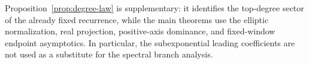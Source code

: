 \begin{remark}\label{rem:linear-degree-growth}
Proposition~\ref{prop:degree-law} is supplementary: it identifies the top-degree sector of the already fixed recurrence, while the main theorems use the elliptic normalization, real projection, positive-axis dominance, and fixed-window endpoint asymptotics.  In particular, the subexponential leading coefficients are not used as a substitute for the spectral branch analysis.
\end{remark}
